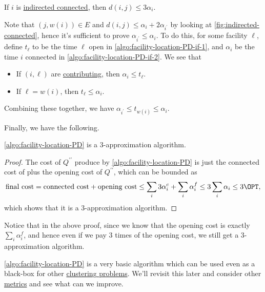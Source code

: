 \begin{claim}
	If \(i\) is \hyperref[not:indirected-connected]{indirected connected}, then \(d(i, j) \leq 3 \alpha _i\).
\end{claim}
\begin{explanation}
	Note that \((j, w(i))\in E\) and \(d(i, j) \leq \alpha _i + 2\alpha _{i^\prime }\) by looking at \autoref{fig:indirected-connected}, hence it's sufficient to prove \(\alpha _{i^\prime } \leq \alpha _i\). To do this, for some facility \(\ell \), define \(t_{\ell}\) to be the time \(\ell \) open in \autoref{algo:facility-location-PD-if-1}, and \(\alpha _i\) be the time \(i\) connected in \autoref{algo:facility-location-PD-if-2}. We see that
	\begin{itemize}
		\item If \((i, \ell )\) are \hyperref[not:contributing]{contributing}, then \(\alpha _i \leq t_{\ell } \).
		\item If \(\ell =w(i)\), then \(t_{\ell } \leq \alpha _i\).
	\end{itemize}
	Combining these together, we have \(\alpha _{i ^\prime} \leq t_{w(i)} \leq \alpha _i\).
\end{explanation}

Finally, we have the following.
\begin{theorem}\label{thm:lec5}
	\autoref{algo:facility-location-PD} is a \(3\)-approximation algorithm.
\end{theorem}
\begin{proof}
	The cost of \(Q^{\prime\prime} \) produce by \autoref{algo:facility-location-PD} is just the connected cost of plus the opening cost of \(Q^{\prime\prime} \), which can be bounded as
	\[
		\text{final cost} = \text{connected cost} + \text{opening cost} \leq \sum _i 3 \alpha _i^c + \sum_i \alpha _i^f \leq 3 \sum_{i} \alpha _i \leq 3 \OPT,
	\]
	which shows that it is a \(3\)-approximation algorithm.
\end{proof}

\begin{note}
	Notice that in the above proof, since we know that the opening cost is exactly \(\sum_{i} \alpha _i^f\), and hence even if we pay \(3\) times of the opening cost, we still get a \(3\)-approximation algorithm.
\end{note}

\begin{remark}
	\autoref{algo:facility-location-PD} is a very basic algorithm which can be used even as a black-box for other \hyperref[prb:clustering]{clustering problems}. We'll revisit this later and consider other \hyperref[def:metric]{metrics} and see what can we improve.
\end{remark}